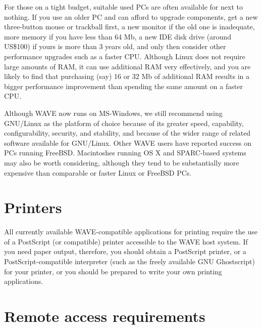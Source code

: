 \documentclass[twoside]{book}
\newcommand{\WAVE}{{\sf WAVE}\xspace}
\begin{document}
\begin{description}
For those on a tight budget, suitable used PCs are often available for next to
nothing.  If you use an older PC and can afford to upgrade components, get a
new three-button mouse or trackball first, a new monitor if the old one is
inadequate, more memory if you have less than 64 Mb, a new IDE disk drive
(around US\$100) if yours is more than 3 years old, and only then consider
other performance upgrades such as a faster CPU.  Although Linux does not
require large amounts of RAM, it can use additional RAM very effectively, and
you are likely to find that purchasing (say) 16 or 32 Mb of additional RAM
results in a bigger performance improvement than spending the same amount on a
faster CPU.

Although \WAVE{} now runs on MS-Windows, we still recommend using
GNU/Linux as the platform of choice because of its greater speed, capability,
configurability, security, and stability, and because of the wider
range of related software available for GNU/Linux. Other \WAVE{} users have
reported success on PCs running FreeBSD.  Macintoshes running OS X
and SPARC-based systems may also be worth considering, although they tend to
be substantially more expensive than comparable or faster Linux or FreeBSD PCs.
\end{description}

\section{Printers}

All currently available \WAVE{}-compatible applications for printing
require the use of a PostScript (or compatible) printer accessible to
the \WAVE{} host
\index{WAVE host@\WAVE{} host}
system.  If you need
paper output, therefore, you should obtain a PostScript printer, or a
PostScript-compatible interpreter (such as the freely available GNU
Ghostscript) for your printer, or you should be prepared to write your
own printing applications.  

\section{Remote access requirements}
\end{document}
